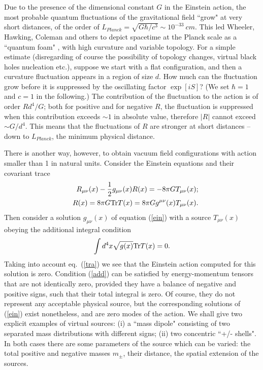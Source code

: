 \documentclass[a4paper,11pt]{article}
\begin{document}
Due to the presence of the dimensional constant $G$ 
in the Einstein action, the most probable quantum 
fluctuations of the gravitational field ``grow" at very 
short distances, of the order of $L_{Planck}= \sqrt{G
\hbar/c^3} \sim 10^{-33} \ cm$. This led Wheeler, Hawking, 
Coleman and others to depict spacetime at the Planck 
scale as a ``quantum foam" \cite{haw}, with high curvature 
and variable topology. For a simple estimate
(disregarding of course the possibility of topology 
changes, virtual black holes nucleation etc.), suppose 
we start with a 
flat configuration, and then a curvature fluctuation 
appears in a region of size $d$. How much can the 
fluctuation grow before it is suppressed by the
oscillating factor $\exp[iS]$? (We set $\hbar=1$ and
$c=1$ in the following.) The contribution of the 
fluctuation to the action is of order $Rd^4/G$; both for 
positive and for negative $R$, the fluctuation is 
suppressed when this contribution exceeds $\sim 1$ in
absolute value, therefore $|R|$ cannot exceed $\sim 
G/d^4$. This means that the fluctuations of $R$ are 
stronger at short distances -- down to $L_{Planck}$, the 
minimum physical distance.
 
There is another way, however, to obtain vacuum field
configurations with action smaller than 1 in natural
units. Consider the Einstein equations 
and their covariant trace         
	\begin{eqnarray} 
	& & R_{\mu \nu}(x)- \frac{1}{2} g_{\mu \nu}(x) R(x)  
	= -8 \pi G T_{\mu \nu}(x); \label{ein} \\
	& & R(x)=8 \pi G {\rm Tr} T(x) =
	8 \pi G g^{\mu \nu}(x) T_{\mu \nu}(x).
\label{tra} 
\end{eqnarray} 
	Then consider a solution $g_{\mu \nu}(x)$ of equation 
(\ref{ein}) with a source $T_{\mu \nu}(x)$ obeying the 
additional integral condition 
	\begin{equation} 
	\int d^4x  \sqrt{g(x)}  {\rm Tr}  T(x) = 0.   
\label{add} 
\end{equation} 
	Taking into account eq.\ (\ref{tra}) we see 
that the Einstein action computed for this solution 
is zero. Condition (\ref{add}) can be satisfied by 
energy-momentum tensors that are not identically zero, 
provided they have a balance of negative and positive 
signs, such that their total integral is zero. Of course, 
they do not represent any acceptable physical source, but 
the corresponding solutions of (\ref{ein}) exist 
nonetheless, and are zero modes of the action.  
We shall give two explicit examples of virtual sources: 
(i) a ``mass dipole"
consisting of two separated mass distributions with
different signs; (ii) two concentric ``+/-
shells". In both cases there are some parameters of the
source which can be varied: the total positive and
negative masses $m_\pm$, their distance, the spatial
extension of the sources. 
\end{document}
